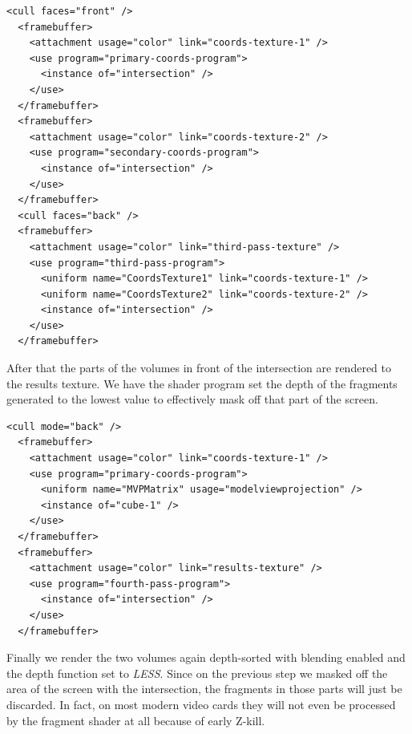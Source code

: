 \documentclass{article}
\begin{document}
\begin{Verbatim}[fontsize=\small]
  <cull faces="front" />
  <framebuffer>
    <attachment usage="color" link="coords-texture-1" />
    <use program="primary-coords-program">
      <instance of="intersection" />
    </use>
  </framebuffer>
  <framebuffer>
    <attachment usage="color" link="coords-texture-2" />
    <use program="secondary-coords-program">
      <instance of="intersection" />
    </use>
  </framebuffer>
  <cull faces="back" />
  <framebuffer>
    <attachment usage="color" link="third-pass-texture" />
    <use program="third-pass-program">
      <uniform name="CoordsTexture1" link="coords-texture-1" />
      <uniform name="CoordsTexture2" link="coords-texture-2" />
      <instance of="intersection" />
    </use>
  </framebuffer>
\end{Verbatim}

After that the parts of the volumes in front of the intersection are rendered to
the results texture.  We have the shader program set the depth of the fragments
generated to the lowest value to effectively mask off that part of the screen.

\begin{Verbatim}[fontsize=\small]
  <cull mode="back" />
  <framebuffer>
    <attachment usage="color" link="coords-texture-1" />
    <use program="primary-coords-program">
      <uniform name="MVPMatrix" usage="modelviewprojection" />
      <instance of="cube-1" />
    </use>
  </framebuffer>
  <framebuffer>
    <attachment usage="color" link="results-texture" />
    <use program="fourth-pass-program">
      <instance of="intersection" />
    </use>
  </framebuffer>
\end{Verbatim}

Finally we render the two volumes again depth-sorted with blending enabled and
the depth function set to \emph{LESS}.  Since on the previous step we masked off
the area of the screen with the intersection, the fragments in those parts will
just be discarded.  In fact, on most modern video cards they will not even be
processed by the fragment shader at all because of early Z-kill.
\end{document}
